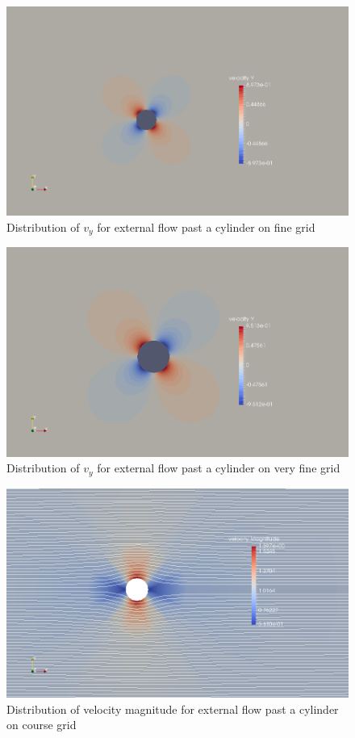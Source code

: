 \documentclass[12pt]{elsarticle}
\begin{document}
	\begin{figure}[h] \label{cyl__vely_fin}
		\centering\includegraphics[width=1.0\linewidth]{vely_fin}
		\caption{Distribution of $v_y$ for external flow past a cylinder on fine grid}
	\end{figure}
	
	\begin{figure}[h] \label{cyl__vely_vfin}
		\centering\includegraphics[width=1.0\linewidth]{vely_vfin}
		\caption{Distribution of $v_y$ for external flow past a cylinder on very fine grid}
	\end{figure}
	
	\begin{figure}[h] \label{cyl__velm_cou}
		\centering\includegraphics[width=1.0\linewidth]{velm_cou}
		\caption{Distribution of velocity magnitude for external flow past a cylinder on course grid}
	\end{figure}
	
\end{document}
